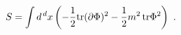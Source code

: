 \begin{equation}
   S = \int d^{\,d} x \left(
       -\frac 12 {\rm tr}(\partial \Phi)^2
       -\frac 12 m^2 \, {\rm tr} \Phi^2 \right) \ .
\end{equation}

